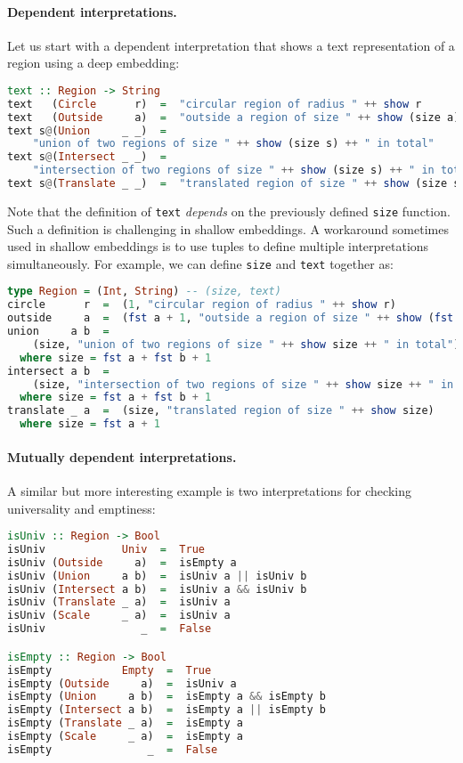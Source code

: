 \paragraph{Dependent interpretations.}
Let us start with a dependent interpretation that shows a text representation of
a region using a deep embedding:

\begin{lstlisting}[language=Haskell]
text :: Region -> String
text   (Circle      r)  =  "circular region of radius " ++ show r
text   (Outside     a)  =  "outside a region of size " ++ show (size a)
text s@(Union     _ _)  =
    "union of two regions of size " ++ show (size s) ++ " in total"
text s@(Intersect _ _)  =
    "intersection of two regions of size " ++ show (size s) ++ " in total"
text s@(Translate _ _)  =  "translated region of size " ++ show (size s)
\end{lstlisting}

\noindent
Note that the definition of \lstinline{text} \emph{depends} on the previously
defined \lstinline{size} function. Such a definition is challenging in shallow
embeddings. A workaround sometimes used in shallow embeddings is to use tuples
to define multiple interpretations simultaneously. For example, we can define
\lstinline{size} and \lstinline{text} together as:

\begin{lstlisting}[language=Haskell,deletekeywords={union,intersect}]
type Region = (Int, String) -- (size, text)
circle      r  =  (1, "circular region of radius " ++ show r)
outside     a  =  (fst a + 1, "outside a region of size " ++ show (fst a))
union     a b  =
    (size, "union of two regions of size " ++ show size ++ " in total")
  where size = fst a + fst b + 1
intersect a b  =
    (size, "intersection of two regions of size " ++ show size ++ " in total")
  where size = fst a + fst b + 1
translate _ a  =  (size, "translated region of size " ++ show size)
  where size = fst a + 1
\end{lstlisting}

\paragraph{Mutually dependent interpretations.} \label{sec:mutual}
A similar but more interesting example is two interpretations for checking
universality and emptiness:

\begin{lstlisting}[language=Haskell]
isUniv :: Region -> Bool
isUniv            Univ  =  True
isUniv (Outside     a)  =  isEmpty a
isUniv (Union     a b)  =  isUniv a || isUniv b
isUniv (Intersect a b)  =  isUniv a && isUniv b
isUniv (Translate _ a)  =  isUniv a
isUniv (Scale     _ a)  =  isUniv a
isUniv               _  =  False

isEmpty :: Region -> Bool
isEmpty           Empty  =  True
isEmpty (Outside     a)  =  isUniv a
isEmpty (Union     a b)  =  isEmpty a && isEmpty b
isEmpty (Intersect a b)  =  isEmpty a || isEmpty b
isEmpty (Translate _ a)  =  isEmpty a
isEmpty (Scale     _ a)  =  isEmpty a
isEmpty               _  =  False
\end{lstlisting}

